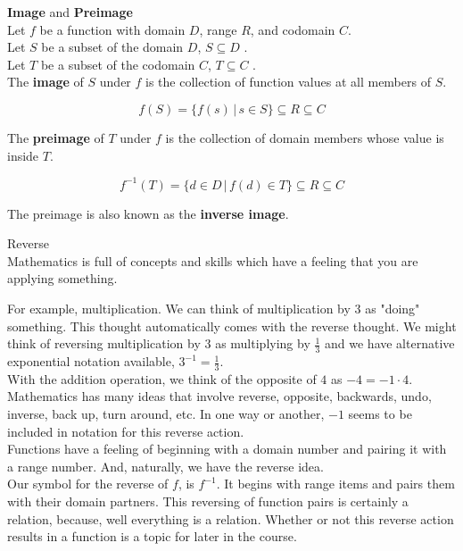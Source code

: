 \documentclass{ximera}
\begin{document}
\begin{definition} \textbf{\textcolor{green!50!black}{Image}} and \textbf{\textcolor{green!50!black}{Preimage}} \\


Let $f$ be a function with domain $D$, range $R$, and codomain $C$. \\
Let $S$ be a subset of the domain $D$, $S \subseteq D$ . \\
Let $T$ be a subset of the codomain $C$, $T \subseteq C$ . \\


The \textbf{image} of $S$ under $f$ is the collection of function values at all members of $S$.

\[
f(S) = \{ f(s) \, | \, s \in S   \} \subseteq R \subseteq C
\]




The \textbf{preimage} of $T$ under $f$ is the collection of domain members whose value is inside $T$.

\[
f^{-1}(T) = \{ d \in D \, | \, f(d) \in T  \} \subseteq R \subseteq C
\]


The preimage is also known as the \textbf{inverse image}.



\end{definition}



\begin{notation} Reverse \\

Mathematics is full of concepts and skills which have a feeling that you are applying something.

For example, multiplication.  We can think of multiplication by $3$ as "doing" something.  This thought automatically comes with the reverse thought.  We might think of reversing multiplication by $3$ as multiplying by $\frac{1}{3}$ and we have alternative exponential notation available, $3^{-1} = \frac{1}{3}$. \\


With the addition operation, we think of the opposite of $4$ as $-4 = -1 \cdot 4$. \\


Mathematics has many ideas that involve reverse, opposite, backwards, undo, inverse, back up, turn around, etc. In one way or another, $-1$ seems to be included in notation for this reverse action.  \\


Functions have a feeling of beginning with a domain number and pairing it with a range number.  And, naturally, we have the reverse idea. \\

Our symbol for the reverse of $f$, is $f^{-1}$.  It begins with range items and pairs them with their domain partners.  This reversing of function pairs is certainly a relation, because, well everything is a relation.  Whether or not this reverse action results in a function is a topic for later in the course.



\end{notation}
\end{document}

